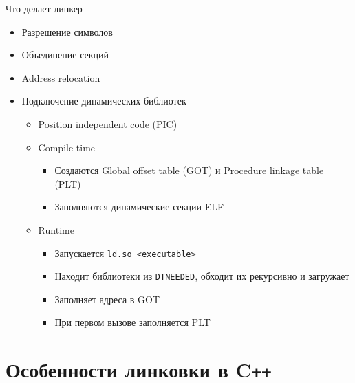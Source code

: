 \documentclass{beamer}
\newcommand\cpp{C\texttt{++}\xspace}
\begin{document}
\begin{frame}{Что делает линкер}
    \begin{itemize}
        \item Разрешение символов
        \item Объединение секций
        \item Address relocation
        \item Подключение динамических библиотек
            \pause
            \begin{itemize}
                \item Position independent code (PIC)
                \item Compile-time
                    \begin{itemize}
                        \item Создаются Global offset table (GOT) и Procedure linkage table (PLT)
                        \item Заполняются динамические секции ELF
                    \end{itemize}
                \item Runtime
                    \begin{itemize}
                        \item Запускается \texttt{ld.so <executable>}
                        \item Находит библиотеки из \texttt{DT\textunderscore NEEDED}, обходит их
                            рекурсивно и загружает
                        \item Заполняет адреса в GOT
                        \item При первом вызове заполняется PLT
                    \end{itemize}
            \end{itemize}
    \end{itemize}
\end{frame}

\section{Особенности линковки в \cpp}
\end{document}
